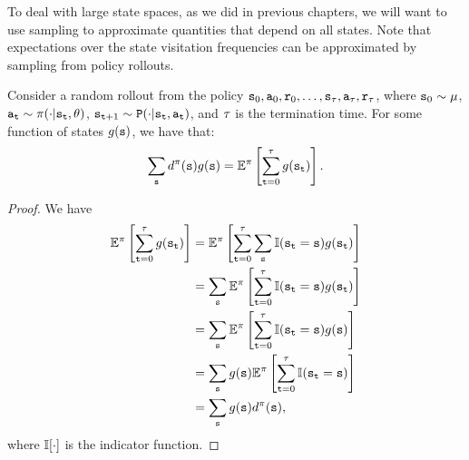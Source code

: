 To deal with large state spaces, as we did in previous chapters, we will want to use sampling to approximate quantities that depend on all states. Note that expectations over the state visitation frequencies can be approximated by sampling from policy rollouts.
\begin{proposition}\label{prop:rollout_sampling}
    Consider a random rollout from the policy ${\tt s}_0,{\tt a}_0,{\tt r}_0,\dots,{\tt s}_\tau, {\tt a}_\tau, {\tt r}_\tau$, where ${\tt s}_0 \sim \mu$, ${\tt a}_{\tt t}\sim \pi(\cdot|{\tt s}_{\tt t},\theta)$, ${\tt s}_{{\tt t}+1} \sim {\tt P} (\cdot | {\tt s}_{\tt t}, {\tt a}_{\tt t})$, and $\tau$ is the termination time. For some function of states $g({\tt s})$, we have that:
    \begin{equation*}
        \sum_{{\tt s}} d^{\pi}({\tt s}) g({\tt s}) = \mathbb{E}^{\pi}\left[ \sum_{{\tt t}=0}^\tau g({\tt s}_{\tt t})\right].
    \end{equation*}
\end{proposition}
\begin{proof}
    We have
    \begin{equation*}
        \begin{split}
            \mathbb{E}^{\pi}\left[ \sum_{{\tt t}=0}^\tau g({\tt s}_{\tt t})\right] &= \mathbb{E}^{\pi}\left[ \sum_{{\tt t}=0}^\tau \sum_{{\tt s}} \mathbb{I}({\tt s}_{\tt t} = {\tt s})g({\tt s}_{\tt t})\right] \\
            &= \sum_{{\tt s}}\mathbb{E}^{\pi}\left[\sum_{{\tt t}=0}^\tau \mathbb{I}({\tt s}_{\tt t} = {\tt s})g({\tt s}_{\tt t})\right] \\
            &= \sum_{{\tt s}}\mathbb{E}^{\pi}\left[\sum_{{\tt t}=0}^\tau \mathbb{I}({\tt s}_{\tt t} = {\tt s})g({\tt s})\right] \\
            &= \sum_{{\tt s}}g({\tt s})\mathbb{E}^{\pi}\left[\sum_{{\tt t}=0}^\tau \mathbb{I}({\tt s}_{\tt t} = {\tt s})\right] \\
            &= \sum_{{\tt s}}g({\tt s})d^{\pi}({\tt s}) ,
        \end{split}
    \end{equation*}
where $\mathbb{I}[\cdot]$ is the indicator function.
\end{proof}

